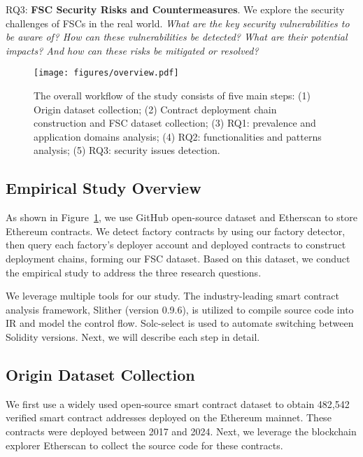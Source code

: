 \documentclass[acmsmall,screen]{acmart}
\begin{document}
	RQ3: \textbf{FSC Security Risks and Countermeasures}. We explore the security challenges of FSCs in the real world. \textit{What are the key security vulnerabilities to be aware of? How can these vulnerabilities be detected? What are their potential impacts? And how can these risks be mitigated or resolved?}

	\begin{figure}[t]
		\centering
		\texttt{[image: figures/overview.pdf]}
		\caption{The overall workflow of the study consists of five main steps: (1) Origin dataset collection; (2) Contract deployment chain construction and FSC dataset collection; (3) RQ1: prevalence and application domains analysis; (4) RQ2: functionalities and patterns analysis; (5) RQ3: security issues detection.}
		\label{fig:workflow}
	\end{figure}


	\subsection{Empirical Study Overview}
	As shown in Figure~\ref{fig:workflow}, we use GitHub open-source dataset \cite{opensourcedata} and Etherscan \cite{etherscan} to store Ethereum contracts. We detect factory contracts by using our factory detector, then query each factory’s deployer account and deployed contracts to construct deployment chains, forming our FSC dataset. Based on this dataset, we conduct the empirical study to address the three research questions.

	We leverage multiple tools for our study. The industry-leading smart contract analysis framework, Slither \cite{slither-tool} (version 0.9.6), is utilized to compile source code into IR and model the control flow. Solc-select \cite{solc-select} is used to automate switching between Solidity versions. Next, we will describe each step in detail.


	\subsection{Origin Dataset Collection}
	We first use a widely used open-source smart contract dataset \cite{opensourcedata} to obtain 482,542 verified smart contract addresses deployed on the Ethereum mainnet. These contracts were deployed between 2017 and 2024. Next, we leverage the blockchain explorer Etherscan \cite{etherscan} to collect the source code for these contracts.
\end{document}
